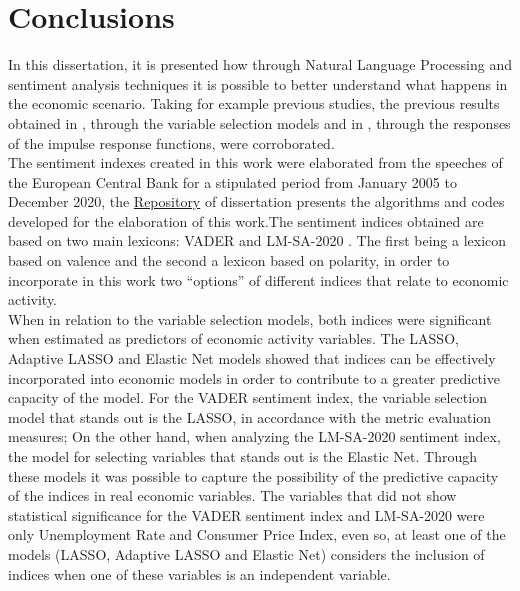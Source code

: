 \chapter{Conclusions}  \label{chapfinal}

In this dissertation, it is presented how through Natural Language Processing and sentiment analysis techniques it is possible to better understand what happens in the economic scenario. Taking for example previous studies, the previous results obtained in \cite{shapiro2020measuring}, through the variable selection models and in \cite{shapiro2020measuring, barsky2012information}, through the responses of the impulse response functions, were corroborated.\\

The sentiment indexes created in this work were elaborated from the speeches of the European Central Bank for a stipulated period from January 2005 to December 2020, the \href{https://github.com/gustavovital/Dissertation}{Repository} of dissertation presents the algorithms and codes developed for the elaboration of this work.The sentiment indices obtained are based on two main lexicons: VADER \cite[]{hutto2014vader} and LM-SA-2020 \cite[]{lmdata}. The first being a lexicon based on valence and the second a lexicon based on polarity, in order to incorporate in this work two ``options'' of different indices that relate to economic activity.\\

When in relation to the variable selection models, both indices were significant when estimated as predictors of economic activity variables. The LASSO, Adaptive LASSO and Elastic Net models showed that indices can be effectively incorporated into economic models in order to contribute to a greater predictive capacity of the model. For the VADER sentiment index, the variable selection model that stands out is the LASSO, in accordance with the metric evaluation measures; On the other hand, when analyzing the LM-SA-2020 sentiment index, the model for selecting variables that stands out is the Elastic Net. Through these models it was possible to capture the possibility of the predictive capacity of the indices in real economic variables. The variables that did not show statistical significance for the VADER sentiment index and LM-SA-2020 were only Unemployment Rate and Consumer Price Index, even so, at least one of the models (LASSO, Adaptive LASSO and Elastic Net) considers the inclusion of indices when one of these variables is an independent variable.\\

